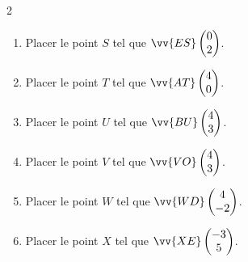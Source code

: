 \documentclass[main.tex]{subfiles}
\begin{document}
\begin{exercise}
\begin{enumerate}[leftmargin=*, label=\arabic*)]
\begin{multicols}{2}
			\begin{enumerate}[leftmargin=*, label=\alph*)]
					\item   Placer le point $S$ tel que $\vv{ES}\begin{pmatrix}
							0\\2
						\end{pmatrix}$.
					\item   Placer le point $T$ tel que $\vv{AT}\begin{pmatrix}
							4\\0
						\end{pmatrix}$.
					\item   Placer le point $U$ tel que $\vv{BU}\begin{pmatrix}
							4\\3
						\end{pmatrix}$.
					\item   Placer le point $V$ tel que $\vv{VO}\begin{pmatrix}
							4\\3
						\end{pmatrix}$.
					\item   Placer le point $W$ tel que $\vv{WD}\begin{pmatrix}
							4\\-2
						\end{pmatrix}$.
					\item   Placer le point $X$ tel que $\vv{XE}\begin{pmatrix}
							-3\\5
						\end{pmatrix}$.
				\end{enumerate}  
		\end{multicols}
	\end{enumerate} 
\end{exercise} 
\end{document}
